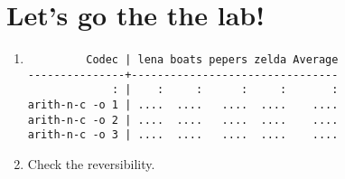 
\section*{Let's go the the lab!}
\begin{enumerate}
\item
\begin{verbatim}
         Codec | lena boats pepers zelda Average
---------------+--------------------------------
             : |    :     :      :     :       :
arith-n-c -o 1 | ....  ....   ....  ....    ....
arith-n-c -o 2 | ....  ....   ....  ....    ....
arith-n-c -o 3 | ....  ....   ....  ....    ....
\end{verbatim}
\item Check the reversibility.
\end{enumerate}
